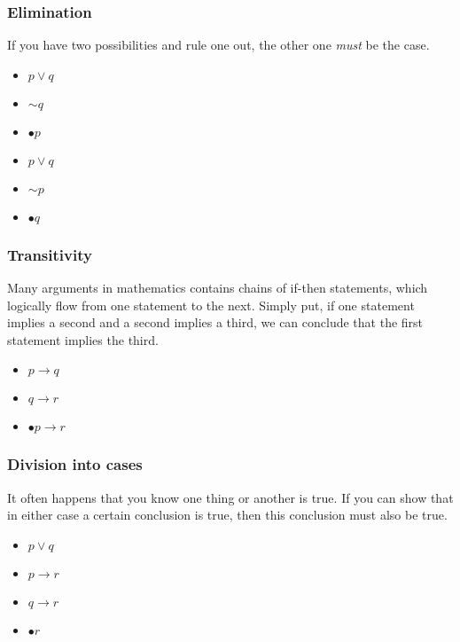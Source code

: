 \documentclass[a4paper]{article}
\begin{document}
\subsubsection{Elimination}
If you have two possibilities and rule one out, the other one \textit{must} be the case.\\
\begin{varwidth}[t]{.5\textwidth}
	\begin{itemize}
		\itemsep0em
		\item[] $p \lor q$
		\item[] $\sim q$
		\item[] $\bullet p$
	\end{itemize}
\end{varwidth}
\hspace{4em}
\begin{varwidth}[t]{.5\textwidth}
	\begin{itemize}
		\itemsep0em
		\item[] $p \lor q$
		\item[] $\sim p$
		\item[] $\bullet q$
	\end{itemize}
\end{varwidth}
\subsubsection{Transitivity}
Many arguments in mathematics contains chains of if-then statements, which logically flow from one statement to the next.
Simply put, if one statement implies a second and a second implies a third, we can conclude that the first statement implies the third.\\
\begin{varwidth}[t]{.5\textwidth}
	\begin{itemize}
		\itemsep0em
		\item[] $p \rightarrow q$
		\item[] $q \rightarrow r$
		\item[] $\bullet p \rightarrow r$
	\end{itemize}
\end{varwidth}

\subsubsection{Division into cases}
It often happens that you know one thing or another is true. If you can show that in either case a certain conclusion is true, then this conclusion must also be true.\\
\begin{varwidth}[t]{.5\textwidth}
	\begin{itemize}
		\itemsep0em
		\item[] $p \lor q$
		\item[] $p \rightarrow r$
		\item[] $q \rightarrow r$
		\item[] $\bullet r$
	\end{itemize}
\end{varwidth}
\end{document}
